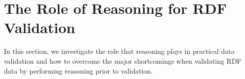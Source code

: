 \documentclass{acm_proc_article-sp}
\newcommand{\tb}[1]{\todo[size=\small, color=green!40]{\textbf{Thomas:} #1}}
\newcommand{\er}[1]{\todo[size=\small, color=red!40]{\textbf{Erman:} #1}}
\begin{document}

\section{The Role of Reasoning for RDF Validation}
\label{the-role-of-reasoning-for-rdf-validation}

In this section, we investigate the role that reasoning plays in practical data validation and 
how to overcome the major shortcomings when validating RDF data by performing reasoning prior to validation.

\end{document}
